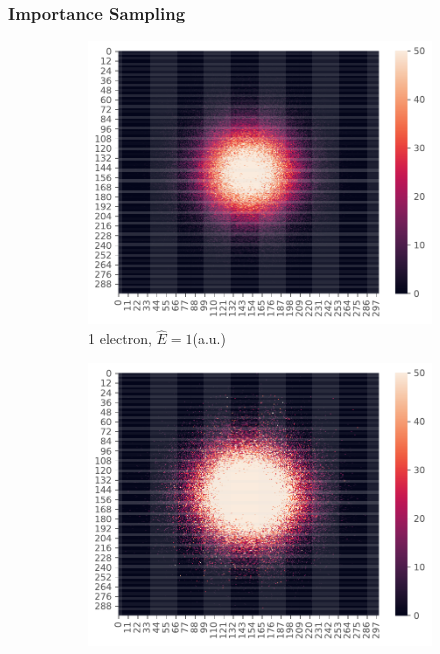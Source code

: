 \documentclass[11pt,a4paper,titlepage]{article}
\begin{document}
\subsubsection{Importance Sampling}
\begin{figure}[H]
\begin{subfigure}[t]{.5\textwidth}
\centering
\includegraphics[trim=0cm 0.0cm 0cm 0cm,scale = 0.6]{D2_P_1I_N_Importance_S_2pow19_eqS_2pow18_Position_sampling_P_1_NH_2_I_0.pdf}
\caption{1 electron, $\hat E = 1$(a.u.)}
\label{imp1}
\end{subfigure}
\begin{subfigure}[t]{.5\textwidth}
\centering
\includegraphics[trim=0cm 0.0cm 0cm 0.0cm,scale = 0.6]{D2_P_2I_N_Importance_S_2pow19_eqS_2pow18_Position_sampling_P_2_NH_2_I_0.pdf}

\end{subfigure}
\end{figure}
\end{document}
